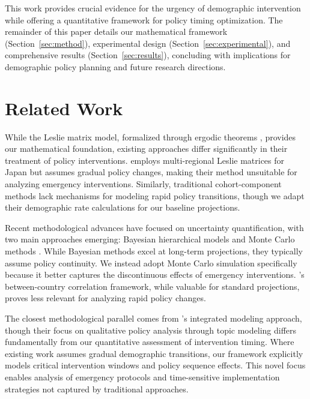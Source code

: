 \documentclass{article} %
\begin{document}
This work provides crucial evidence for the urgency of demographic intervention while offering a quantitative framework for policy timing optimization. The remainder of this paper details our mathematical framework (Section~\ref{sec:method}), experimental design (Section~\ref{sec:experimental}), and comprehensive results (Section~\ref{sec:results}), concluding with implications for demographic policy planning and future research directions.

\section{Related Work}
\label{sec:related}

While the Leslie matrix model, formalized through ergodic theorems \citep{Cohen1979ErgodicTO}, provides our mathematical foundation, existing approaches differ significantly in their treatment of policy interventions. \citet{Oizumi2022SensitivityAO} employs multi-regional Leslie matrices for Japan but assumes gradual policy changes, making their method unsuitable for analyzing emergency interventions. Similarly, traditional cohort-component methods \citep{Smith2001StateAL} lack mechanisms for modeling rapid policy transitions, though we adapt their demographic rate calculations for our baseline projections.

Recent methodological advances have focused on uncertainty quantification, with two main approaches emerging: Bayesian hierarchical models \citep{Raftery2014BayesianPP, Lamnisos2019DemographicFO} and Monte Carlo methods \citep{Osés-Arranz2017ProbabilisticPP, ho2020StochasticPP}. While Bayesian methods excel at long-term projections, they typically assume policy continuity. We instead adopt Monte Carlo simulation specifically because it better captures the discontinuous effects of emergency interventions. \citet{Fosdick2012RegionalPF}'s between-country correlation framework, while valuable for standard projections, proves less relevant for analyzing rapid policy changes.

The closest methodological parallel comes from \citet{Young-Chool2025ExploringAT}'s integrated modeling approach, though their focus on qualitative policy analysis through topic modeling differs fundamentally from our quantitative assessment of intervention timing. Where existing work assumes gradual demographic transitions, our framework explicitly models critical intervention windows and policy sequence effects. This novel focus enables analysis of emergency protocols and time-sensitive implementation strategies not captured by traditional approaches.
\end{document}
